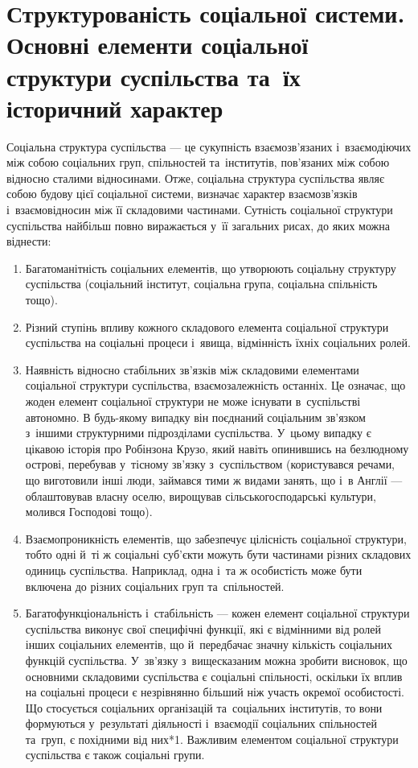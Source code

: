 \documentclass[a5paper,oneside,DIV=12,12pt,headings=small]{scrartcl}
\begin{document}
	\section{Структурованість соціальної системи. Основні елементи соціальної структури суспільства та~їх історичний характер}
		Соціальна структура суспільства — це сукупність взаємозв'язаних і~взаємодіючих між собою соціальних груп, спільностей та~інститутів, пов'язаних між собою відносно сталими відносинами. Отже, соціальна структура суспільства являє собою будову цієї соціальної системи, визначає характер взаємозв'язків і~взаємовідносин між її складовими частинами. Сутність соціальної структури суспільства найбільш повно виражається у~її загальних рисах, до яких можна віднести:
		\begin{enumerate}
			\item Багатоманітність соціальних елементів, що утворюють соціальну структуру суспільства (соціальний інститут, соціальна група, соціальна спільність тощо).
			\item Різний ступінь впливу кожного складового елемента соціальної структури суспільства на соціальні процеси і~явища, відмінність їхніх соціальних ролей.
			\item Наявність відносно стабільних зв'язків між складовими елементами соціальної структури суспільства, взаємозалежність останніх. Це означає, що жоден елемент соціальної структури не може існувати в~суспільстві автономно. В будь-якому випадку він поєднаний соціальним зв'язком з~іншими структурними підрозділами суспільства. У~цьому випадку є цікавою історія про Робінзона Крузо, який навіть опинившись на безлюдному острові, перебував у~тісному зв'язку з~суспільством (користувався речами, що виготовили інші люди, займався тими ж видами занять, що і~в Англії — облаштовував власну оселю, вирощував сільськогосподарські культури, молився Господові тощо).
			\item Взаємопроникність елементів, що забезпечує цілісність соціальної структури, тобто одні й~ті ж соціальні суб'\-єкти можуть бути частинами різних складових одиниць суспільства. Наприклад, одна і~та ж особистість може бути включена до різних соціальних груп та~спільностей.
			\item Багатофункціональність і~стабільність — кожен елемент соціальної структури суспільства виконує свої специфічні функції, які є відмінними від ролей інших соціальних елементів, що й~передбачає значну кількість соціальних функцій суспільства. У~зв'язку з~вищесказаним можна зробити висновок, що основними складовими суспільства є соціальні спільності, оскільки їх вплив на соціальні процеси є незрівнянно більший ніж участь окремої особистості. Що стосується соціальних організацій та~соціальних інститутів, то вони формуються у~результаті діяльності і~взаємодії соціальних спільностей та~груп, є похідними від них*1. Важливим елементом соціальної структури суспільства є також соціальні групи.
		\end{enumerate}
		
\end{document}
